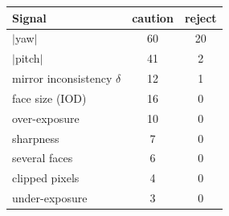 \begin{tabular}{@{}lcc@{}}
\toprule
Signal & caution & reject\\
\midrule
$|$yaw$|$ & 60 & 20\\
$|$pitch$|$ & 41 & 2\\
mirror inconsistency $\delta$ & 12 & 1\\
face size (IOD) & 16 & 0\\
over-exposure & 10 & 0\\
sharpness & 7 & 0\\
several faces & 6 & 0\\
clipped pixels & 4 & 0\\
under-exposure & 3 & 0\\
\bottomrule
\end{tabular}
